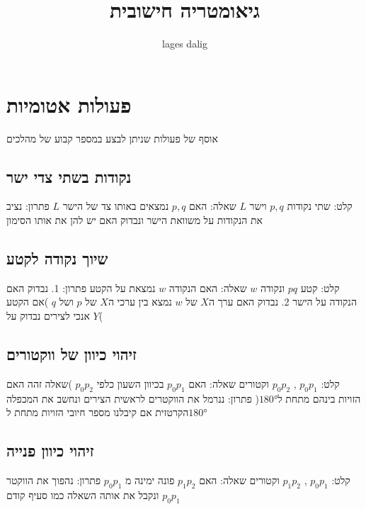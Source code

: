 \documentclass{article}
\title{ גיאומטריה חישובית }
\author{lages dalig}
\makeatletter
\newcommand*{\saved@uline}{}
\let\saved@uline\uline
\newcommand*{\mathuline}{%
  \mathpalette{\math@uline\saved@uline}%
}
\newcommand*{\math@uline}[3]{%
  \mbox{#1{$#2#3\m@th$}}%
}
\renewcommand*{\uline}{%
  \relax  
  \ifmmode
    \expandafter\mathuline
  \else
    \expandafter\saved@uline
  \fi
}
\makeatother
\begin{document}
\maketitle


\section{ פעולות אטומיות}
\noindent אוסף של פעולות שניתן לבצע במספר קבוע של מהלכים

\subsection{נקודות בשתי צדי ישר}
\noindent \uline{קלט:} שתי נקודות $p,q$ וישר $L$
\newline \uline{ שאלה:} האם $p,q$ נמצאים באותו צד של הישר $L$
\newline \uline{פתרון:} נציב את הנקודות על משוואת הישר ונבדוק האם יש להן את אותו הסימון

\subsection{שיוך נקודה לקטע}
\noindent \uline{קלט:} קטע $pq$ ונקודה $w$
\newline \uline{ שאלה:} האם הנקודה $w$ נמצאת על הקטע
\newline \uline{פתרון:} 1. נבדוק האם הנקודה על הישר 2. נבדוק האם ערך ה$X$ של $w$ נמצא בין ערכי ה$X$ של $p$ ושל $q$ )אם הקטע אנכי לצירים נבדוק על $Y$(

\subsection{זיהוי כיוון של ווקטורים}
\noindent \uline{קלט:} $p_0p_1$ , $p_0p_2$ וקטורים
\newline \uline{שאלה:} האם $p_0p_1$ בכיוון השעון כלפי $p_0p_2$ )שאלה זהה האם הזויות בינהם מתחת ל$\ang{180}$(
\newline \uline{פתרון:} ננרמל את הווקטרים לראשית הצירים ונחשב את המכפלה הקרטזית אם קיבלנו מספר חיובי הזויות מתחת ל$\ang{180}$

\subsection{זיהוי כיוון פנייה}
\noindent \uline{קלט:} $p_0p_1$ , $p_1p_2$ וקטורים
\newline \uline{שאלה:} האם $p_1p_2$ פונה ימינה מ $p_0p_1$
\newline \uline{פתרון:} נהפוך את הווקטר $p_0p_1$ ונקבל את אותה השאלה כמו סעיף קודם
\end{document}
